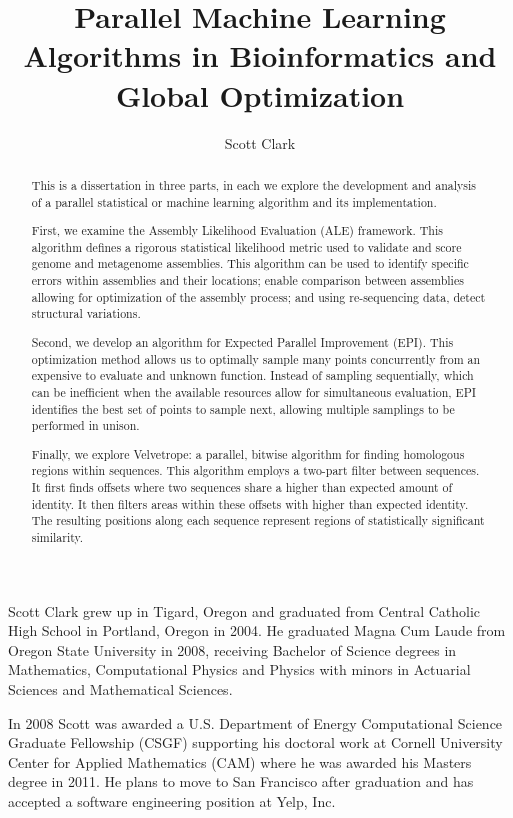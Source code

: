 \documentclass[phd,tocprelim]{cornell}
\title {Parallel Machine Learning Algorithms in Bioinformatics and Global Optimization}
\author {Scott Clark}
\begin{document}
\maketitle
\makecopyright

\begin{abstract}
This is a dissertation in three parts, in each we explore the development and analysis of a parallel statistical or machine learning algorithm and its implementation.

First, we examine the Assembly Likelihood Evaluation (ALE) framework. This algorithm defines a rigorous statistical likelihood metric used to validate and score genome and metagenome assemblies. This algorithm can be used to identify specific errors within assemblies and their locations; enable comparison between assemblies allowing for optimization of the assembly process; and using re-sequencing data, detect structural variations.

Second, we develop an algorithm for Expected Parallel Improvement (EPI). This optimization method allows us to optimally sample many points concurrently from an expensive to evaluate and unknown function. Instead of sampling sequentially, which can be inefficient when the available resources allow for simultaneous evaluation, EPI identifies the best set of points to sample next, allowing multiple samplings to be performed in unison.

Finally, we explore Velvetrope: a parallel, bitwise algorithm for finding homologous regions within sequences. This algorithm employs a two-part filter between sequences. It first finds offsets where two sequences share a higher than expected amount of identity. It then filters areas within these offsets with higher than expected identity. The resulting positions along each sequence represent regions of statistically significant similarity.
\end{abstract}

\begin{biosketch}
Scott Clark grew up in Tigard, Oregon and graduated from Central Catholic High School in Portland, Oregon in 2004. He graduated Magna Cum Laude from Oregon State University in 2008, receiving Bachelor of Science degrees in Mathematics, Computational Physics and Physics with minors in Actuarial Sciences and Mathematical Sciences.

In 2008 Scott was awarded a U.S. Department of Energy Computational Science Graduate Fellowship (CSGF) supporting his doctoral work at Cornell University Center for Applied Mathematics (CAM) where he was awarded his Masters degree in 2011. He plans to move to San Francisco after graduation and has accepted a software engineering position at Yelp, Inc.
\end{biosketch}
\end{document}
